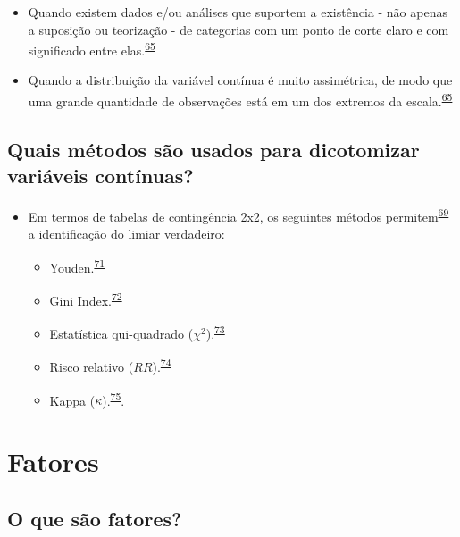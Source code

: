 \documentclass[
  a4paper,
]{book}
\begin{document}
\begin{itemize}
\item
  Quando existem dados e/ou análises que suportem a existência - não apenas a suposição ou teorização - de categorias com um ponto de corte claro e com significado entre elas.\textsuperscript{\protect\hyperlink{ref-MacCallum2002}{65}}
\item
  Quando a distribuição da variável contínua é muito assimétrica, de modo que uma grande quantidade de observações está em um dos extremos da escala.\textsuperscript{\protect\hyperlink{ref-MacCallum2002}{65}}
\end{itemize}

\hypertarget{quais-muxe9todos-suxe3o-usados-para-dicotomizar-variuxe1veis-contuxednuas}{%
\subsection{Quais métodos são usados para dicotomizar variáveis contínuas?}\label{quais-muxe9todos-suxe3o-usados-para-dicotomizar-variuxe1veis-contuxednuas}}

\begin{itemize}
\item
  Em termos de tabelas de contingência 2x2, os seguintes métodos permitem\textsuperscript{\protect\hyperlink{ref-Prince2017}{69}} a identificação do limiar verdadeiro:

  \begin{itemize}
  \item
    Youden.\textsuperscript{\protect\hyperlink{ref-YOUDEN1950}{71}}
  \item
    Gini Index.\textsuperscript{\protect\hyperlink{ref-strobl2007}{72}}
  \item
    Estatística qui-quadrado (\(\chi^2\)).\textsuperscript{\protect\hyperlink{ref-pearson1900}{73}}
  \item
    Risco relativo (\(RR\)).\textsuperscript{\protect\hyperlink{ref-Greiner2000}{74}}
  \item
    Kappa (\(\kappa\)).\textsuperscript{\protect\hyperlink{ref-fleiss1971}{75}}.
  \end{itemize}
\end{itemize}

\hypertarget{fatores}{%
\section{Fatores}\label{fatores}}

\hypertarget{o-que-suxe3o-fatores}{%
\subsection{O que são fatores?}\label{o-que-suxe3o-fatores}}
\end{document}

